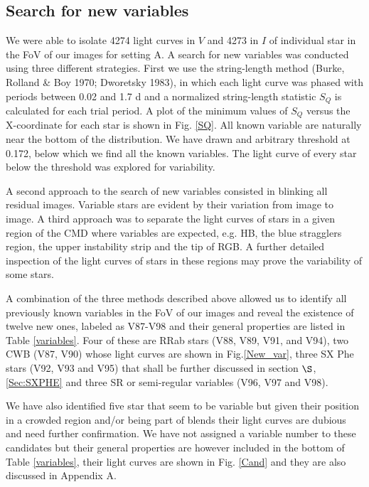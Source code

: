 \documentclass[journal]{rmaa}
\newcommand{\1}{\'{\i}}
\begin{document}
\subsection{Search for new variables}
We were able to isolate 4274 light curves in $V$ and 4273 in $I$ of individual star
in the FoV of our images for setting A. A search for new variables was conducted using
three different strategies. First we use the string-length method (Burke, Rolland \&
Boy 1970; Dworetsky 1983), in which each light curve was phased
with periods between 0.02 and 1.7 d and a normalized string-length
statistic $S_Q$ is calculated for each trial period. A plot of the minimum values
of $S_Q$ versus the
X-coordinate for each star is shown in Fig. \ref{SQ}. All known variable are
naturally near the bottom of the distribution. We have drawn and arbitrary threshold
at 0.172, below which we find all the known variables. The light curve of
every star below the threshold was explored for variability.

A second approach to the search of new variables consisted in blinking all
residual images. Variable stars are evident by their variation from image to
image. A third approach was to
separate the light curves of stars in a given region of the CMD
where variables are expected, e.g. HB, the blue stragglers region, the upper
instability strip and the tip of RGB. A further detailed inspection of the light
curves of stars in these regions may prove the variability of some stars.

A combination of the three methods described above allowed us to identify all
previously
known variables in the FoV of our images and reveal the existence of twelve new
ones, labeled as V87-V98 and their general properties are listed in Table
\ref{variables}. Four of these are RRab stars (V88, V89, V91, and V94), two
CWB (V87, V90) whose light curves are shown in Fig.\ref{New_var}, three SX Phe
stars (V92, V93 and V95) that shall be further discussed in section $\S$,
\ref{Sec:SXPHE} and three SR or semi-regular variables  (V96, V97
and V98).

We have also identified five star that seem to be variable but given their
position in a crowded region and/or being part of blends their light curves are
dubious and need further confirmation. We have not assigned a variable number to
these candidates but their general properties are however included
in the bottom of Table \ref{variables}, their light curves are shown in Fig.
\ref{Cand} and they are also discussed in Appendix A.
\end{document}
